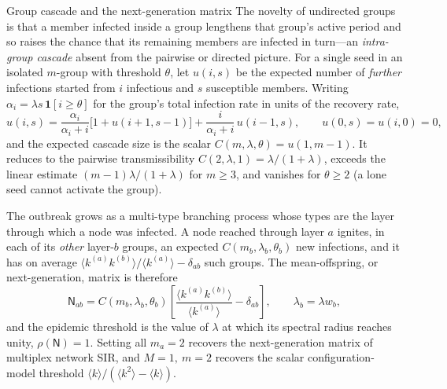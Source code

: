 \documentclass[11pt]{article}
\newcounter{sbox}
\newcommand{\avg}[1]{\langle #1 \rangle}
\newcommand{\kk}[1]{k^{(#1)}}
\newcommand{\Nmat}{\mathsf{N}}
\begin{document}
\begin{sbox}{Group cascade and the next-generation matrix}\label{box:model}
The novelty of undirected groups is that a member infected inside a group
lengthens that group's active period and so raises the chance that its
remaining members are infected in turn---an \emph{intra-group cascade} absent
from the pairwise or directed picture. For a single seed in an isolated
$m$-group with threshold $\theta$, let $u(i,s)$ be the expected number of
\emph{further} infections started from $i$ infectious and $s$ susceptible
members. Writing $\alpha_i=\lambda s\,\mathbf 1[i\ge\theta]$ for the group's
total infection rate in units of the recovery rate,
\begin{equation}
u(i,s)=\frac{\alpha_i}{\alpha_i+i}\bigl[1+u(i+1,s-1)\bigr]
        +\frac{i}{\alpha_i+i}\,u(i-1,s),
\qquad u(0,s)=u(i,0)=0,
\label{eq:cascade}
\end{equation}
and the expected cascade size is the scalar $C(m,\lambda,\theta)=u(1,m-1)$. It
reduces to the pairwise transmissibility $C(2,\lambda,1)=\lambda/(1+\lambda)$,
exceeds the linear estimate $(m-1)\lambda/(1+\lambda)$ for $m\ge3$, and
vanishes for $\theta\ge2$ (a lone seed cannot activate the group).

The outbreak grows as a multi-type branching process whose types are the
layer through which a node was infected. A node reached through layer $a$
ignites, in each of its \emph{other} layer-$b$ groups, an expected
$C(m_b,\lambda_b,\theta_b)$ new infections, and it has on average
$\avg{\kk a\kk b}/\avg{\kk a}-\delta_{ab}$ such groups. The mean-offspring, or
next-generation, matrix is therefore
\begin{equation}
\Nmat_{ab}=C(m_b,\lambda_b,\theta_b)
      \left[\frac{\avg{\kk a\kk b}}{\avg{\kk a}}-\delta_{ab}\right],
\qquad \lambda_b=\lambda w_b ,
\label{eq:ngm}
\end{equation}
and the epidemic threshold is the value of $\lambda$ at which its spectral
radius reaches unity, $\rho(\Nmat)=1$. Setting all $m_a=2$ recovers the
next-generation matrix of multiplex network SIR, and $M=1,\ m=2$ recovers the
scalar configuration-model threshold $\avg{k}/(\avg{k^2}-\avg{k})$.
\end{sbox}
\end{document}
